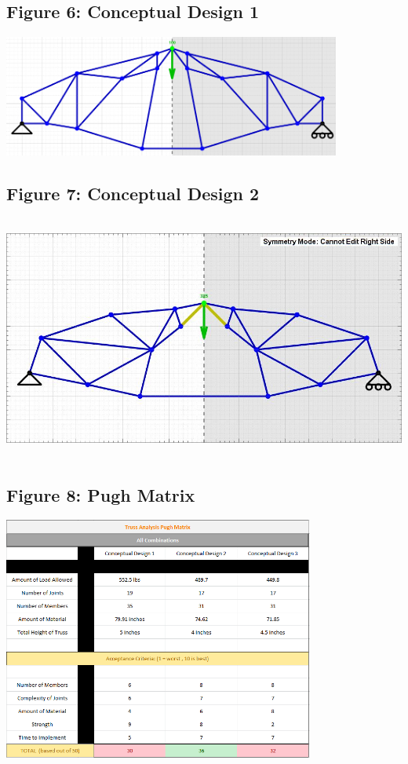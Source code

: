 \documentclass{article}
\begin{document}
\subsection{Figure 6: Conceptual Design 1}
\begin{center}{\includegraphics[height=4cm]{truss552.png}}\end{center}

\subsection{Figure 7: Conceptual Design 2}
\begin{center}{\includegraphics[height=8cm]{truss489.jpg}}\end{center}

\subsection{Figure 8: Pugh Matrix}
\begin{center}{\includegraphics[height=8cm]{PughMatrix.png}}\end{center}
\end{document}

